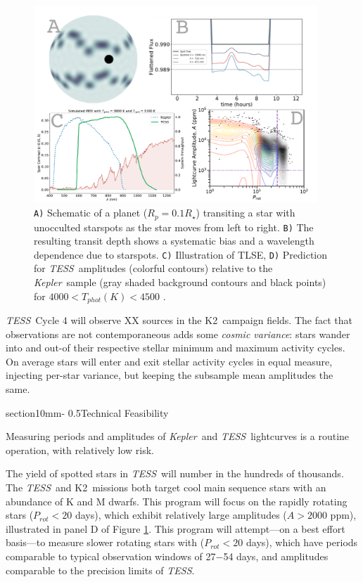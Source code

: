 \documentclass[letterpaper,12pt]{article}
\makeatletter
\renewcommand{\section}{\@startsection%
{section}{1}{0mm}{-\baselineskip}%
{0.5\baselineskip}{\normalfont\Large\bfseries}}%
\newcommand{\tess}{{\it TESS}}
\newcommand{\kepler}{{\it Kepler}}
\newcommand{\ktwo}{{K2}}
\makeatother
\begin{document}
\begin{figure}[hbt!]
\includegraphics[width=0.95\textwidth]{figures/multi_panel.pdf}
\caption{\texttt{A)} Schematic of a planet ($R_p = 0.1 R_\star$) transiting a star with unocculted starspots as the star moves from left to right.  \texttt{B)} The resulting transit depth shows a systematic bias and a wavelength dependence due to starspots. \texttt{C)} Illustration of TLSE, \texttt{D)} Prediction for \tess\ amplitudes (colorful contours) relative to the \kepler\ sample (gray shaded background contours and black points) for $4000 < T_{phot} (K) < 4500$ \cite{2014ApJS..211...24M}.}
\label{fig:predictAmps}
\end{figure}

\tess\ Cycle 4 will observe XX sources in the \ktwo\ campaign fields.  The fact that observations are not contemporaneous adds some \emph{cosmic variance}: stars wander into and out-of their respective stellar minimum and maximum activity cycles. On average stars will enter and exit stellar activity cycles in equal measure, injecting per-star variance, but keeping the subsample mean amplitudes the same.

\section{Technical Feasibility}

Measuring periods and amplitudes of \kepler\ and \tess\ lightcurves is a routine operation, with relatively low risk.  

The yield of spotted stars in \tess\ will number in the hundreds of thousands.  The \tess\ and \ktwo\ missions both target cool main sequence stars with an abundance of K and M dwarfs.  This program will focus on the rapidly rotating stars ($P_{rot}<20$ days), which exhibit relatively large amplitudes ($A>2000$ ppm), illustrated in panel D of Figure \ref{fig:predictAmps}.  This program will attempt---on a best effort basis---to measure slower rotating stars with ($P_{rot}<20$ days), which have periods comparable to typical observation windows of 27$-$54 days, and amplitudes comparable to the precision limits of \tess.
\end{document}
